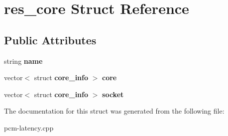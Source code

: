 \section{res\+\_\+core Struct Reference}
\label{structres__core}
\subsection*{Public Attributes}
\begin{DoxyCompactItemize}
\item 
\mbox{\label{structres__core_acde99add41c25d48446d8ea7ca301a8b}} 
string {\bfseries name}
\item 
\mbox{\label{structres__core_a3ad975a16acc8954822dca7c7dc7cb19}} 
vector$<$ struct \textbf{ core\+\_\+info} $>$ {\bfseries core}
\item 
\mbox{\label{structres__core_aedad02675c203cf20b199e8210b7f5c8}} 
vector$<$ struct \textbf{ core\+\_\+info} $>$ {\bfseries socket}
\end{DoxyCompactItemize}


The documentation for this struct was generated from the following file\+:\begin{DoxyCompactItemize}
\item 
pcm-\/latency.\+cpp\end{DoxyCompactItemize}
